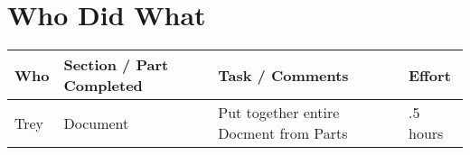 \clearpage
\section{Who Did What}
\begin{table}[!h]
    \begin{tabular}{|p{2.5cm}|p{4.5cm}|p{4.5cm}|p{2.5cm}|}
   	\hline
	 Who   & Section / Part Completed & Task / Comments & Effort \\
	 \hline
	  Trey  & Document & Put together entire Docment from Parts & .5 hours \\
 	 \hline
    \end{tabular}
\end{table}
